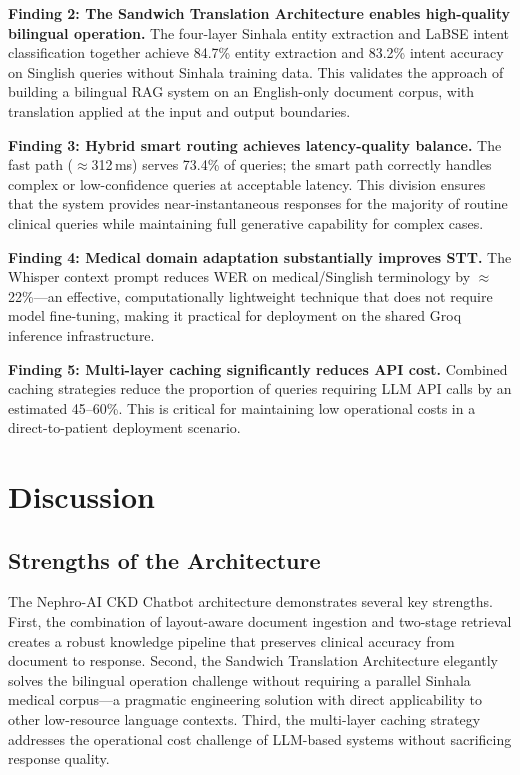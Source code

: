 \documentclass[12pt,a4paper]{report}
\begin{document}
\textbf{Finding 2: The Sandwich Translation Architecture enables high-quality bilingual operation.}
The four-layer Sinhala entity extraction and LaBSE intent classification together achieve 84.7\% entity extraction and 83.2\% intent accuracy on Singlish queries without Sinhala training data. This validates the approach of building a bilingual RAG system on an English-only document corpus, with translation applied at the input and output boundaries.

\textbf{Finding 3: Hybrid smart routing achieves latency-quality balance.}
The fast path ($\approx$312\,ms) serves 73.4\% of queries; the smart path correctly handles complex or low-confidence queries at acceptable latency. This division ensures that the system provides near-instantaneous responses for the majority of routine clinical queries while maintaining full generative capability for complex cases.

\textbf{Finding 4: Medical domain adaptation substantially improves STT.}
The Whisper context prompt reduces WER on medical/Singlish terminology by $\approx$22\%---an effective, computationally lightweight technique that does not require model fine-tuning, making it practical for deployment on the shared Groq inference infrastructure.

\textbf{Finding 5: Multi-layer caching significantly reduces API cost.}
Combined caching strategies reduce the proportion of queries requiring LLM API calls by an estimated 45--60\%. This is critical for maintaining low operational costs in a direct-to-patient deployment scenario.

\section{Discussion}

\subsection{Strengths of the Architecture}

The Nephro-AI CKD Chatbot architecture demonstrates several key strengths. First, the combination of layout-aware document ingestion and two-stage retrieval creates a robust knowledge pipeline that preserves clinical accuracy from document to response. Second, the Sandwich Translation Architecture elegantly solves the bilingual operation challenge without requiring a parallel Sinhala medical corpus---a pragmatic engineering solution with direct applicability to other low-resource language contexts. Third, the multi-layer caching strategy addresses the operational cost challenge of LLM-based systems without sacrificing response quality.
\end{document}
